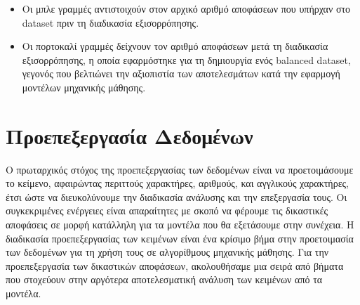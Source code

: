 \documentclass[diploma]{softlab-thesis}
\begin{document}
\begin{itemize}
\item Οι μπλε γραμμές αντιστοιχούν στον αρχικό αριθμό αποφάσεων που υπήρχαν στο dataset πριν τη διαδικασία εξισορρόπησης. 
\item Οι πορτοκαλί γραμμές δείχνουν τον αριθμό αποφάσεων μετά τη διαδικασία εξισορρόπησης, η οποία εφαρμόστηκε για τη δημιουργία ενός balanced dataset, γεγονός που βελτιώνει την αξιοπιστία των αποτελεσμάτων κατά την εφαρμογή μοντέλων μηχανικής μάθησης.
\end{itemize}


\section{Προεπεξεργασία Δεδομένων}

Ο πρωταρχικός στόχος της προεπεξεργασίας των δεδομένων είναι να προετοιμάσουμε το κείμενο, αφαιρώντας περιττούς χαρακτήρες, αριθμούς, και αγγλικούς χαρακτήρες, έτσι ώστε να διευκολύνουμε την διαδικασία ανάλυσης και την επεξεργασία τους. Οι συγκεκριμένες ενέργειες είναι απαραίτητες με σκοπό να φέρουμε τις δικαστικές αποφάσεις σε μορφή κατάλληλη για τα μοντέλα που θα εξετάσουμε στην συνέχεια. Η διαδικασία προεπεξεργασίας των κειμένων είναι ένα κρίσιμο βήμα στην προετοιμασία των δεδομένων για τη χρήση τους σε αλγορίθμους μηχανικής μάθησης. Για την προεπεξεργασία των δικαστικών αποφάσεων, ακολουθήσαμε μια σειρά από βήματα που στοχεύουν στην αργότερα αποτελεσματική ανάλυση των κειμένων από τα μοντέλα.
\end{document}
